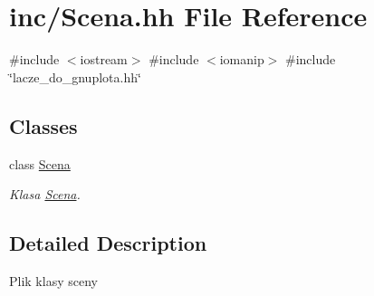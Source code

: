 \hypertarget{_scena_8hh}{}\section{inc/\+Scena.hh File Reference}
\label{_scena_8hh}
{\ttfamily \#include $<$iostream$>$}\newline
{\ttfamily \#include $<$iomanip$>$}\newline
{\ttfamily \#include \char`\"{}lacze\+\_\+do\+\_\+gnuplota.\+hh\char`\"{}}\newline
\subsection*{Classes}
\begin{DoxyCompactItemize}
\item 
class \mbox{\hyperlink{class_scena}{Scena}}
\begin{DoxyCompactList}\small\item\em Klasa \mbox{\hyperlink{class_scena}{Scena}}. \end{DoxyCompactList}\end{DoxyCompactItemize}


\subsection{Detailed Description}
Plik klasy sceny 